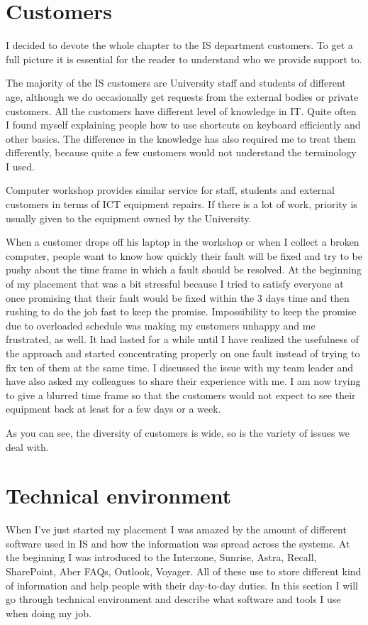 \documentclass[10pt,a4paper,headinclude=true,twoside]{report}
\begin{document}
\chapter{Customers}
I decided to devote the whole chapter to the IS department customers. To get a full picture it is essential for the reader to understand who we provide support to.

The majority of the IS customers are University staff and students of different age, although we do occasionally get requests from the external bodies or private customers. All the customers have different level of knowledge in IT. Quite often I found myself explaining people how to use shortcuts on keyboard efficiently and other basics. The difference in the knowledge has also required me to treat them differently, because quite a few customers would not understand the terminology I used.  

Computer workshop provides similar service for staff, students and external customers in terms of ICT equipment repairs. If there is a lot of work, priority is usually given to the equipment owned by the University.

When a customer drops off his laptop in the workshop or when I collect a broken computer, people want to know how quickly their fault will be fixed and try to be pushy about the time frame in which a fault should be resolved. At the beginning of my placement that was a bit stressful because I tried to satisfy everyone at once promising that their fault would be fixed within the 3 days time and then rushing to do the job fast to keep the promise. Impossibility to keep the promise due to overloaded schedule was making my customers unhappy and me frustrated, as well. It had lasted for a while until I have realized the usefulness of the approach and started concentrating properly on one fault instead of trying to fix ten of them at the same time. I discussed the issue with my team leader and have also asked my colleagues to share their experience with me. I am now trying to give a blurred time frame so that the customers would not expect to see their equipment back at least for a few days or a week. 

As you can see, the diversity of customers is wide, so is the variety of issues we deal with.

\chapter{Technical environment}
When I've just started my placement I was amazed by the amount of different software used in IS and how the information was spread across the systems. At the beginning I was introduced to the Interzone, Sunrise, Astra, Recall, SharePoint, Aber FAQs, Outlook, Voyager. All of these use to store different kind of information and help people with their day-to-day duties. In this section I will go through technical environment and describe what software and tools I use when doing my job.
  
\end{document}
